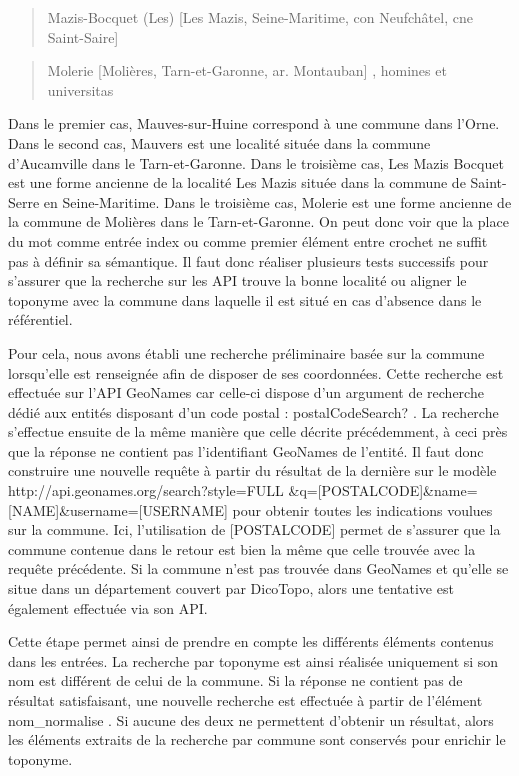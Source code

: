 \documentclass[a4paper,12pt,twoside]{book}
\begin{document}
	\begin{quotation}
		Mazis-Bocquet (Les) [Les Mazis, Seine-Maritime, con Neufchâtel, cne Saint-Saire]
	\end{quotation}

	\begin{quotation}
		Molerie [Molières, Tarn-et-Garonne, ar. Montauban] , homines et universitas
	\end{quotation}
	
	
	\noindent Dans le premier cas, Mauves-sur-Huine correspond à une commune dans l'Orne. Dans le second cas, Mauvers est une localité située dans la commune d'Aucamville dans le Tarn-et-Garonne. Dans le troisième cas, Les Mazis Bocquet est une forme ancienne de la localité Les Mazis située dans la commune de Saint-Serre en Seine-Maritime. Dans le troisième cas, Molerie est une forme ancienne de la commune de Molières dans le Tarn-et-Garonne. On peut donc voir que la place du mot comme entrée index ou comme premier élément entre crochet ne suffit pas à définir sa sémantique. Il faut donc réaliser plusieurs tests successifs pour s'assurer que la recherche sur les API trouve la bonne localité ou aligner le toponyme avec la commune dans laquelle il est situé en cas d'absence dans le référentiel.
	
	Pour cela, nous avons établi une recherche préliminaire basée sur la commune lorsqu'elle est renseignée afin de disposer de ses coordonnées. Cette recherche est effectuée sur l'API GeoNames car celle-ci dispose d'un argument de recherche dédié aux entités disposant d'un code postal : \og postalCodeSearch? \fg{}. La recherche s'effectue ensuite de la même manière que celle décrite précédemment, à ceci près que la réponse ne contient pas l'identifiant GeoNames de l'entité. Il faut donc construire une nouvelle requête à partir du résultat de la dernière sur le modèle \og http://api.geonames.org/search?style=FULL \&q=[POSTALCODE]\&name=[NAME]\&username=[USERNAME]\fg{} pour obtenir toutes les indications voulues sur la commune. Ici, l'utilisation de [POSTALCODE] permet de s'assurer que la commune contenue dans le retour est bien la même que celle trouvée avec la requête précédente. Si la commune n'est pas trouvée dans GeoNames et qu'elle se situe dans un département couvert par DicoTopo, alors une tentative est également effectuée via son API.
	
	Cette étape permet ainsi de prendre en compte les différents éléments contenus dans les entrées. La recherche par toponyme est ainsi réalisée uniquement si son nom est différent de celui de la commune. Si la réponse ne contient pas de résultat satisfaisant, une nouvelle recherche est effectuée à partir de l'élément \og nom\_normalise \fg{}. Si aucune des deux ne permettent d'obtenir un résultat, alors les éléments extraits de la recherche par commune sont conservés pour enrichir le toponyme.
	
\end{document}
